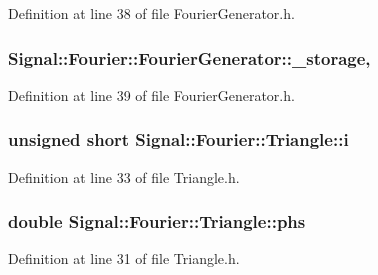 Definition at line 38 of file Fourier\+Generator.\+h.

\hypertarget{classSignal_1_1Fourier_1_1FourierGenerator_ab6e6b79cf56e31c9a1b5766f357f8cfb}{
\subsubsection[{\+\_\+storage}]{ Signal\+::\+Fourier\+::\+Fourier\+Generator\+::\+\_\+storage\hspace{0.3cm}{\ttfamily [protected]}, {\ttfamily [inherited]}}}\label{classSignal_1_1Fourier_1_1FourierGenerator_ab6e6b79cf56e31c9a1b5766f357f8cfb}


Definition at line 39 of file Fourier\+Generator.\+h.

\hypertarget{classSignal_1_1Fourier_1_1Triangle_a08b51bfe6697483ed00af4d41e1e66f2}{
\subsubsection[{i}]{\setlength{\rightskip}{0pt plus 5cm}unsigned short Signal\+::\+Fourier\+::\+Triangle\+::i\hspace{0.3cm}{\ttfamily [protected]}}}\label{classSignal_1_1Fourier_1_1Triangle_a08b51bfe6697483ed00af4d41e1e66f2}


Definition at line 33 of file Triangle.\+h.

\hypertarget{classSignal_1_1Fourier_1_1Triangle_a5a6c140fe0bc67cb34676c8cec1206d8}{
\subsubsection[{phs}]{\setlength{\rightskip}{0pt plus 5cm}double Signal\+::\+Fourier\+::\+Triangle\+::phs\hspace{0.3cm}{\ttfamily [protected]}}}\label{classSignal_1_1Fourier_1_1Triangle_a5a6c140fe0bc67cb34676c8cec1206d8}


Definition at line 31 of file Triangle.\+h.

